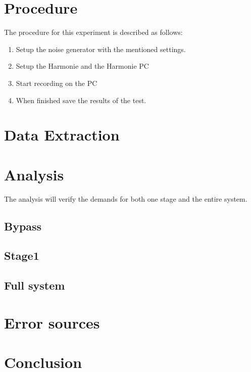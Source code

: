 \section{Procedure}
The procedure for this experiment is described as follows:
\vspace{-5mm}
\begin{enumerate}
\item Setup the noise generator with the mentioned settings.
\item Setup the Harmonie and the Harmonie PC
\item Start recording on the PC
\item When finished save the results of the test.
\end{enumerate}

\section{Data Extraction}


\section{Analysis}
The analysis will verify the demands for both one stage and the entire system.

\subsection*{Bypass}


\subsection*{Stage1}

\subsection*{Full system}


\section{Error sources}


\section{Conclusion}
